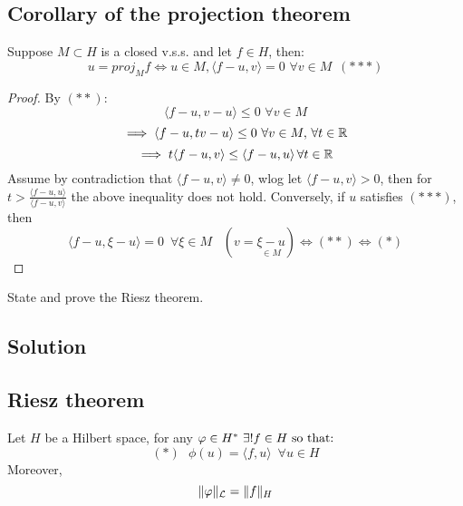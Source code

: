 \subsection{Corollary of the projection theorem}
Suppose $M \subset H$ is a closed v.s.s. and let $f\in H$, then:
\[ u = proj_M f \iff u\in M, \langle f-u,v\rangle = 0\,\,\forall v \in M\,\,\,(***) \]

\begin{proof}
By $(**)$:
\[ \langle f-u,v-u \rangle \le 0\,\, \forall v \in M \]
\[ \implies \langle f-u,tv-u \rangle \le 0\,\,\forall v \in M,\,\forall t \in \R \]
\[ \implies t\langle f-u,v \rangle \le\langle f-u,u \rangle \,\forall t \in \R \]
Assume by contradiction that $\langle f-u,v \rangle \neq 0$, wlog let $\langle f-u,v \rangle >0$, then for $t> \displaystyle\frac{\langle f-u,u \rangle}{\langle f-u,v \rangle}$ the above inequality does not hold.
\newline Conversely, if $u $ satisfies $ (***)$, then
\[ \langle f-u,\xi -u \rangle = 0\,\,\, \forall \xi \in M\,\,\,\,\,(v=\underset{\in M}{\xi - u}) \iff (**) \iff (*) \]
\end{proof}


\question
State and prove the Riesz theorem.

\subsection*{Solution}

\subsection{Riesz theorem}
Let $H$ be a Hilbert space, for any $\phi \in H^* \,\,\exists! f\in H\mbox{ so that:}\\$
\[ (*) \,\,\,\,\phi(u)=\langle f,u\rangle\,\,\,\forall u\in H \]
Moreover,
\[ \|\phi\|_{\Leb}=\|f\|_H \]

